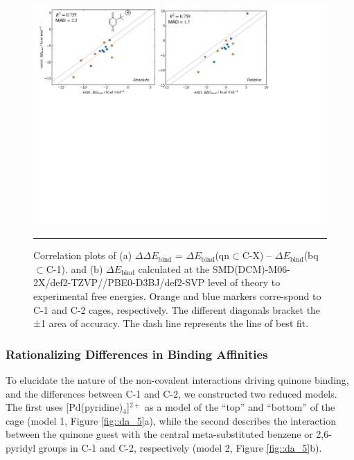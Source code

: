 \documentclass[../../main.tex]{subfiles}
\begin{document}
\begin{figure}[h!]
	\vspace{0.4cm}
	\centering
	\includegraphics[width=\textwidth]{3/da/figs/fig4/fig4.pdf}
	\vspace{0.2cm}
	\hrule
	\caption{Correlation plots of (a) $\Delta\Delta E_\text{bind}$ = $\Delta E_\text{bind}$(qn$\subset$C-X) – $\Delta E_\text{bind}$(bq$\subset$C-1). and (b) $\Delta E_\text{bind}$ calculated at the SMD(DCM)-M06-2X/def2-TZVP//PBE0-D3BJ/def2-SVP level of theory to experimental free energies. Orange and blue markers corre-spond to C-1 and C-2 cages, respectively. The different diagonals bracket the ±1 \kcalx area of accuracy. The dash line represents the line of best fit.}
	\label{fig::da_4}
\end{figure}


\subsubsection{Rationalizing Differences in Binding Affinities}
 To elucidate the nature of the non-covalent interactions driving quinone binding, and the differences between C-1 and C-2, we constructed two reduced models. The first uses [Pd(pyridine)$_4$]$^{2+}$ as a model of the “top” and “bottom” of the cage (model 1, Figure \ref{fig::da_5}a), while the second describes the interaction between the quinone guest with the central meta-substituted benzene or 2,6-pyridyl groups in C-1 and C-2, respectively (model 2, Figure \ref{fig::da_5}b). 
\end{document}
